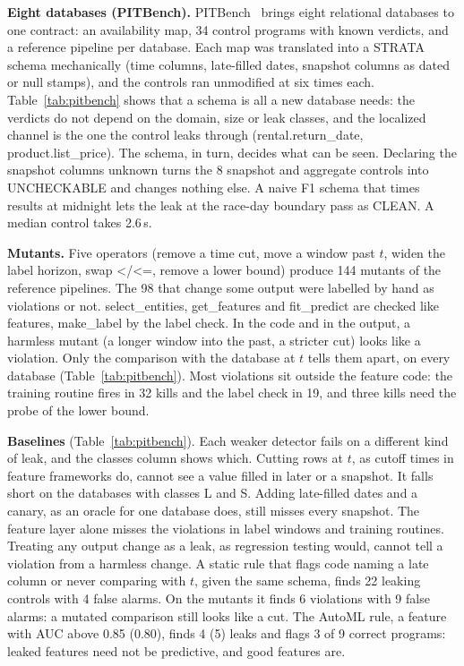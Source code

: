 \documentclass[10pt,conference]{IEEEtran}
\newcommand{\tool}{STRATA}
\begin{document}
\textbf{Eight databases (PITBench).} PITBench~\cite{pitbench} brings eight
relational databases to one contract: an availability map, 34 control
programs with known verdicts, and a reference pipeline per database. Each
map was translated into a \tool{} schema mechanically (time columns,
late-filled dates, snapshot columns as dated or null stamps), and
the controls ran unmodified at six times each. Table~\ref{tab:pitbench}
shows that a schema is all a new database needs: the verdicts do not depend
on the domain, size or leak classes, and the localized channel is the one
the control leaks through (rental.return\_date, product.list\_price). The
schema, in turn, decides what can be seen. Declaring the snapshot columns
unknown turns the 8 snapshot and aggregate controls into
UNCHECKABLE and changes nothing else. A naive F1 schema that times
results at midnight lets the leak at the race-day boundary pass as
CLEAN. A median control takes 2.6\,s.

\textbf{Mutants.} Five operators (remove a time cut, move a window past
$t$, widen the label horizon, swap </<=, remove a lower
bound) produce 144 mutants of the reference pipelines. The 98 that change
some output were labelled by hand as violations or not.
select\_entities, get\_features and fit\_predict
are checked like features, make\_label by the label check. In the
code and in the output, a harmless mutant (a longer window into the past, a
stricter cut) looks like a violation. Only the comparison with the database
at $t$ tells them apart, on every database (Table~\ref{tab:pitbench}). Most violations sit outside the feature code: the training
routine fires in 32 kills and the label check in 19, and three kills need
the probe of the lower bound.

\textbf{Baselines} (Table~\ref{tab:pitbench}). Each weaker detector fails
on a different kind of leak, and the classes column shows which. Cutting
rows at $t$, as cutoff times in feature frameworks do, cannot see a value
filled in later or a snapshot. It falls short on the databases with classes
L and S. Adding late-filled dates and a canary, as an oracle for one
database does, still misses every snapshot. The feature layer
alone misses the violations in label windows and training routines.
Treating any output change as a leak, as regression testing would, cannot
tell a violation from a harmless change. A static rule that flags code naming a late column or never
comparing with $t$, given the same schema, finds 22 leaking controls with 4
false alarms. On the mutants it finds 6 violations with 9 false alarms: a
mutated comparison still looks like a cut. The AutoML rule, a feature with AUC
above 0.85 (0.80), finds 4 (5) leaks and flags 3 of 9 correct programs:
leaked features need not be predictive, and good features are.
\end{document}
